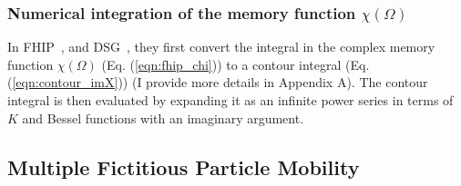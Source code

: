 \subsubsection{Numerical integration of the memory function $\chi(\Omega)$}

In FHIP~\cite{feynman_mobility_1962}, and DSG~\cite{devreese_optical_1972}, they first convert the integral in the complex memory function $\chi(\Omega)$ (Eq. (\ref{eqn:fhip_chi})) to a contour integral (Eq. (\ref{eqn:contour_imX})) (I provide more details in Appendix A). The contour integral is then evaluated by expanding it as an infinite power series in terms of $K$ and Bessel functions with an imaginary argument. 


\subsection{Multiple Fictitious Particle Mobility}

